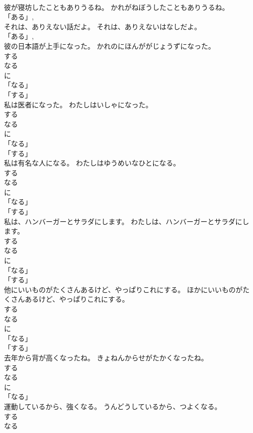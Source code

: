 \documentclass[8pt]{extreport}
\begin{document}
\begin{CJK}{UTF8}{min}
\\	彼が寝坊したこともありうるね。	かれがねぼうしたこともありうるね。	
\\	「ある」, 
\\	それは、ありえない話だよ。	それは、ありえないはなしだよ。	
\\	「ある」, 
\\	彼の日本語が上手になった。	かれのにほんががじょうずになった。	
\\	する 
\\	なる 
\\	に 
\\	「なる」 
\\	「する」 
\\	私は医者になった。	わたしはいしゃになった。	
\\	する 
\\	なる 
\\	に 
\\	「なる」 
\\	「する」 
\\	私は有名な人になる。	わたしはゆうめいなひとになる。	
\\	する 
\\	なる 
\\	に 
\\	「なる」 
\\	「する」 
\\	私は、ハンバーガーとサラダにします。	わたしは、ハンバーガーとサラダにします。	
\\	する 
\\	なる 
\\	に 
\\	「なる」 
\\	「する」 
\\	他にいいものがたくさんあるけど、やっぱりこれにする。	ほかにいいものがたくさんあるけど、やっぱりこれにする。	
\\	する 
\\	なる 
\\	に 
\\	「なる」 
\\	「する」 
\\	去年から背が高くなったね。	きょねんからせがたかくなったね。	
\\	する 
\\	なる 
\\	に 
\\	「なる」 
\\	運動しているから、強くなる。	うんどうしているから、つよくなる。	
\\	する 
\\	なる 

\end{CJK}
\end{document}
